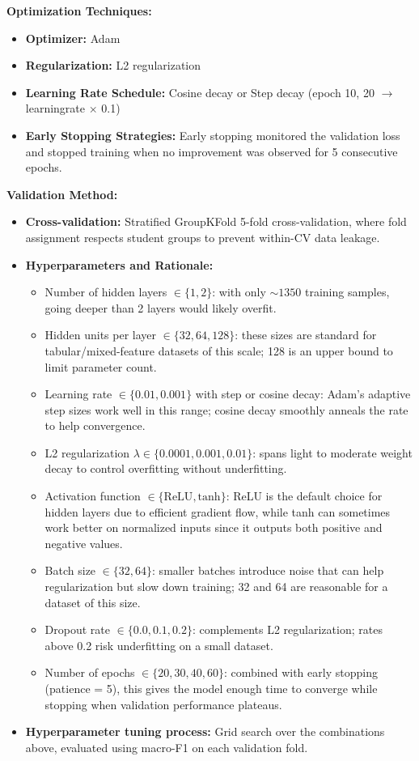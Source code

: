 \documentclass[12pt]{article}
\begin{document}
\textbf{Optimization Techniques:}
    \begin{itemize}
        \item \textbf{Optimizer:} Adam
        \item \textbf{Regularization:} L2 regularization
        \item \textbf{Learning Rate Schedule:}
Cosine decay or Step decay (epoch 10, 20 $\to$ learningrate $\times$ 0.1)
        \item \textbf{Early Stopping Strategies:} Early stopping monitored the validation loss and stopped training when no improvement was observed for 5 consecutive epochs.
    \end{itemize}

\textbf{Validation Method:}
        \begin{itemize}
        \item \textbf{Cross-validation:} Stratified GroupKFold 5-fold cross-validation, where fold assignment respects student groups to prevent within-CV data leakage.
        \item \textbf{Hyperparameters and Rationale:}
            \begin{itemize}
                \item Number of hidden layers $\in \{1, 2\}$: with only ${\sim}1350$ training samples, going deeper than 2 layers would likely overfit. 
                \item Hidden units per layer $\in \{32, 64, 128\}$: these sizes are standard for tabular/mixed-feature datasets of this scale; 128 is an upper bound to limit parameter count.
                \item Learning rate $\in \{0.01, 0.001\}$ with step or cosine decay: Adam's adaptive step sizes work well in this range; cosine decay smoothly anneals the rate to help convergence.
                \item L2 regularization $\lambda \in \{0.0001, 0.001, 0.01\}$: spans light to moderate weight decay to control overfitting without underfitting.
                \item Activation function $\in \{\text{ReLU}, \text{tanh}\}$: ReLU is the default choice for hidden layers due to efficient gradient flow, while tanh can sometimes work better on normalized inputs since it outputs both positive and negative values.
                \item Batch size $\in \{32, 64\}$: smaller batches introduce noise that can help regularization but slow down training; 32 and 64 are reasonable for a dataset of this size.
                \item Dropout rate $\in \{0.0, 0.1, 0.2\}$: complements L2 regularization; rates above 0.2 risk underfitting on a small dataset.
                \item Number of epochs $\in \{20, 30, 40, 60\}$: combined with early stopping (patience = 5), this gives the model enough time to converge while stopping when validation performance plateaus.
            \end{itemize}
        \item \textbf{Hyperparameter tuning process:} Grid search over the combinations above, evaluated using macro-F1 on each validation fold.
        

\end{itemize}
\end{document}
